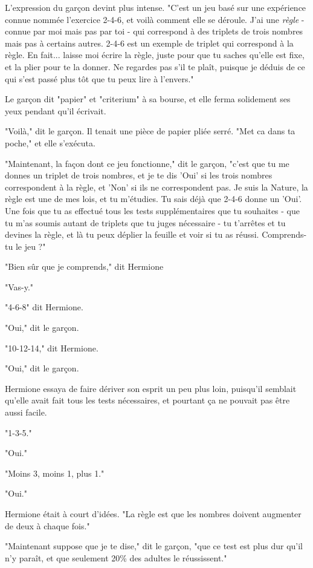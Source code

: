 L'expression du garçon devint plus intense. "C'est un jeu basé sur une expérience connue nommée l'exercice 2-4-6, et voilà comment elle se déroule. J'ai une \emph{règle } - connue par moi mais pas par toi - qui correspond à des triplets de trois nombres mais pas à certains autres. 2-4-6 est un exemple de triplet qui correspond à la règle. En fait... laisse moi écrire la règle, juste pour que tu saches qu'elle est fixe, et la plier pour te la donner. Ne regardes pas s'il te plaît, puisque je déduis de ce qui s'est passé plus tôt que tu peux lire à l'envers."

Le garçon dit "papier" et "criterium" à sa bourse, et elle ferma solidement ses yeux pendant qu'il écrivait.

"Voilà," dit le garçon. Il tenait une pièce de papier pliée serré. "Met ca dans ta poche," et elle s'exécuta.

"Maintenant, la façon dont ce jeu fonctionne," dit le garçon, "c'est que tu me donnes un triplet de trois nombres, et je te dis 'Oui' si les trois nombres correspondent à la règle, et 'Non' si ils ne correspondent pas. Je suis la Nature, la règle est une de mes lois, et tu m'étudies. Tu sais déjà que 2-4-6 donne un 'Oui'. Une fois que tu as effectué tous les tests supplémentaires que tu souhaites - que tu m'as soumis autant de triplets que tu juges nécessaire - tu t'arrêtes et tu devines la règle, et là tu peux déplier la feuille et voir si tu as réussi. Comprends-tu le jeu ?"

"Bien sûr que je comprends," dit Hermione

"Vas-y."

"4-6-8" dit Hermione.

"Oui," dit le garçon.

"10-12-14," dit Hermione.

"Oui," dit le garçon.

Hermione essaya de faire dériver son esprit un peu plus loin, puisqu'il semblait qu'elle avait fait tous les tests nécessaires, et pourtant ça ne pouvait pas être aussi facile.

"1-3-5."

"Oui."

"Moins 3, moins 1, plus 1."

"Oui."

Hermione était à court d'idées. "La règle est que les nombres doivent augmenter de deux à chaque fois."

"Maintenant suppose que je te dise," dit le garçon, "que ce test est plus dur qu'il n'y paraît, et que seulement 20\% des adultes le réussissent."

